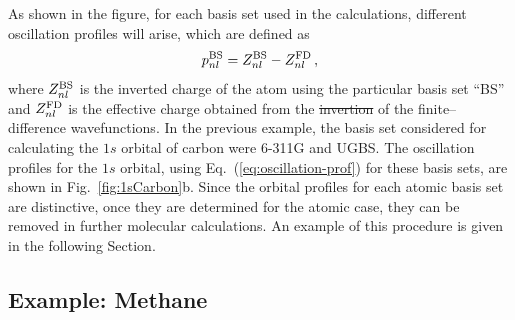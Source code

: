 \documentclass[10pt]{article}
\providecommand{\DIFaddtex}[1]{{\protect\color{blue}\uwave{#1}}} %
\providecommand{\DIFdeltex}[1]{{\protect\color{red}\sout{#1}}}                      %
\providecommand{\DIFaddbegin}{} %
\providecommand{\DIFaddend}{} %
\providecommand{\DIFdelbegin}{} %
\providecommand{\DIFdelend}{} %
\providecommand{\DIFadd}[1]{\texorpdfstring{\DIFaddtex{#1}}{#1}} %
\providecommand{\DIFdel}[1]{\texorpdfstring{\DIFdeltex{#1}}{}} %
\newcommand{\DIFscaledelfig}{0.5}
\newlength{\DIFdelgraphicswidth} %
\newlength{\DIFdelgraphicsheight} %
\newcommand{\DIFaddincludegraphics}[2][]{{\color{blue}\fbox{\DIFOincludegraphics[#1]{#2}}}} %
\newcommand{\DIFdelincludegraphics}[2][]{%
\sbox{\DIFdelgraphicsbox}{\DIFOincludegraphics[#1]{#2}}%
\settoboxwidth{\DIFdelgraphicswidth}{\DIFdelgraphicsbox} %
\settoboxtotalheight{\DIFdelgraphicsheight}{\DIFdelgraphicsbox} %
\scalebox{\DIFscaledelfig}{%
\parbox[b]{\DIFdelgraphicswidth}{\usebox{\DIFdelgraphicsbox}\\[-\baselineskip] \rule{\DIFdelgraphicswidth}{0em}}\llap{\resizebox{\DIFdelgraphicswidth}{\DIFdelgraphicsheight}{%
\setlength{\unitlength}{\DIFdelgraphicswidth}%
\begin{picture}(1,1)%
\thicklines\linethickness{2pt} %
{\color[rgb]{1,0,0}\put(0,0){\framebox(1,1){}}}%
{\color[rgb]{1,0,0}\put(0,0){\line( 1,1){1}}}%
{\color[rgb]{1,0,0}\put(0,1){\line(1,-1){1}}}%
\end{picture}%
}\hspace*{3pt}}} %
} %
\DeclareRobustCommand{\DIFaddbegin}{\DIFOaddbegin \let\includegraphics\DIFaddincludegraphics} %
\DeclareRobustCommand{\DIFaddend}{\DIFOaddend \let\includegraphics\DIFOincludegraphics} %
\DeclareRobustCommand{\DIFdelbegin}{\DIFOdelbegin \let\includegraphics\DIFdelincludegraphics} %
\DeclareRobustCommand{\DIFdelend}{\DIFOaddend \let\includegraphics\DIFOincludegraphics} %
\begin{document}
As shown in the figure, for each basis set used in the calculations,
different oscillation profiles will arise, which are defined as 
\begin{equation}
 p_{nl}^{\mbox{\scriptsize BS}} = Z_{nl}^{\mbox{\scriptsize BS}}-
 Z_{nl}^{\mbox{\scriptsize FD}} \,,
 \label{eq:oscillation-prof}
\end{equation}
where $Z_{nl}^{\mbox{\scriptsize BS}}$ is the inverted charge of the atom 
using the particular basis set ``BS'' and 
$Z_{nl}^{\mbox{\scriptsize FD}}$ is the effective charge obtained 
from the \DIFdelbegin \DIFdel{invertion }\DIFdelend \DIFaddbegin \DIFadd{inversion }\DIFaddend of the finite--difference wavefunctions. 
In the previous example, the basis set considered for calculating 
the $1s$ orbital of carbon were \mbox{6-311G} and UGBS. The 
oscillation profiles for the $1s$ orbital, using Eq.~(\ref{eq:oscillation-prof}) 
for these basis sets, are shown in Fig.~\ref{fig:1sCarbon}b. 
Since the orbital profiles for each atomic basis set are distinctive,
once they are determined for the atomic case, they can be removed 
in further molecular calculations. An example of this procedure 
is given in the following Section.

\subsection{Example: Methane}
\label{sec:dimmethane}
\end{document}
